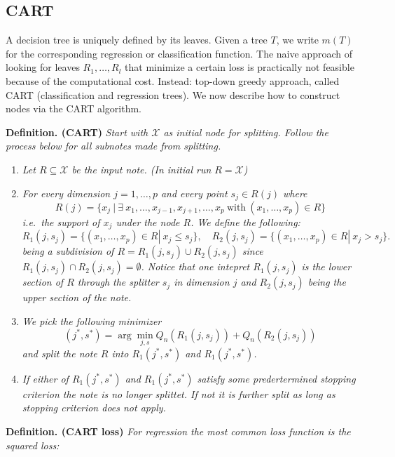 \documentclass[a4paper,10pt,openany]{book}
\providecommand{\tightlist}{%
 \setlength{\itemsep}{0pt}\setlength{\parskip}{0pt}}
\begin{document}
\hypertarget{cart}{%
\subsection{CART}\label{cart}}

A decision tree is uniquely defined by its leaves. Given a tree \(T\), we write \(m(T)\) for the corresponding regression or classification function. The naive approach of looking for leaves \(R_1,\dots, R_l\) that minimize a certain loss is practically not feasible because of the computational cost. Instead: top-down greedy approach, called CART (classification and regression trees). We now describe how to construct nodes via the CART algorithm.

\textbf{Definition. (CART)} \emph{Start with \(\mathcal X\) as initial node for splitting. Follow the process below for all subnotes made from splitting.}

\begin{enumerate}
\def\labelenumi{\arabic{enumi})}
\tightlist
\item
  \emph{Let \(R\subseteq \mathcal X\) be the input note. (In initial run \(R=\mathcal X\))}
\item
  \emph{For every dimension \(j=1,\dots,p\) and every point \(s_j\in R(j)\) where}
  \[R(j)= \{x_j\ |\     \exists\ x_1,\dots,x_{j-1},x_{j+1},\dots,x_p\ \text{with}\ (x_1,\dots,x_p)\in R\}\]
  \emph{i.e.~the support of \(x_j\) under the node \(R\). We define the following:}
  \[R_1(j,s_j)=\{(x_1,\dots,x_p)\in R| \ x_j \leq s_j\}, \quad R_2(j,s_j)=\{(x_1,\dots,x_p)\in R| \ x_j > s_j\}.\]
  \emph{being a subdivision of \(R=R_1(j,s_j)\cup R_2(j,s_j)\) since \(R_1(j,s_j)\cap R_2(j,s_j)=\emptyset\). Notice that one intepret \(R_1(j,s_j)\) is the lower section of \(R\) through the splitter \(s_j\) in dimension \(j\) and \(R_2(j,s_j)\) being the upper section of the note.}
\item
  \emph{We pick the following minimizer}
  \[(j^\ast,s^\ast)= \arg\min_{j,s} Q_n(R_1(j,s_j)) + Q_n(R_2(j,s_j))\]
  \emph{and split the note \(R\) into \(R_1(j^*,s^*)\) and \(R_1(j^*,s^*)\).}
\item
  \emph{If either of \(R_1(j^*,s^*)\) and \(R_1(j^*,s^*)\) satisfy some predertermined stopping criterion the note is no longer splittet. If not it is further split as long as stopping criterion does not apply.}
\end{enumerate}

\textbf{Definition. (CART loss)} \emph{For regression the most common loss function is the squared loss:}
\end{document}
